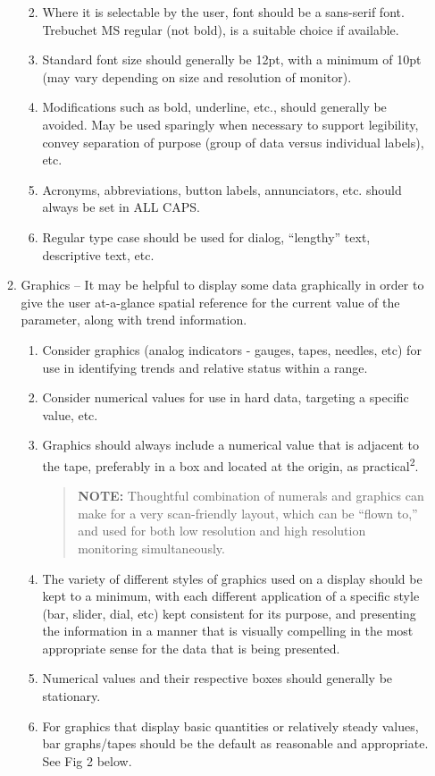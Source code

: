 \documentclass[
]{book}
\providecommand{\tightlist}{%
  \setlength{\itemsep}{0pt}\setlength{\parskip}{0pt}}
\begin{document}
\begin{enumerate}
\begin{enumerate}
    \begin{enumerate}
    \def\labelenumiii{\arabic{enumiii}.}
    \tightlist
    \item
      Where it is selectable by the user, font should be a sans-serif font. Trebuchet MS regular (not bold), is a suitable choice if available.
    \item
      Standard font size should generally be 12pt, with a minimum of 10pt (may vary depending on size and resolution of monitor).
    \item
      Modifications such as bold, underline, etc., should generally be avoided. May be used sparingly when necessary to support legibility, convey separation of purpose (group of data versus individual labels), etc.
    \item
      Acronyms, abbreviations, button labels, annunciators, etc. should always be set in ALL CAPS.
    \item
      Regular type case should be used for dialog, ``lengthy'' text, descriptive text, etc.
    \end{enumerate}
  \item
    Graphics -- It may be helpful to display some data graphically in order to give the user at-a-glance spatial reference for the current value of the parameter, along with trend information.

    \begin{enumerate}
    \def\labelenumiii{\arabic{enumiii}.}
    \item
      Consider graphics (analog indicators - gauges, tapes, needles, etc) for use in identifying trends and relative status within a range.
    \item
      Consider numerical values for use in hard data, targeting a specific value, etc.
    \item
      Graphics should always include a numerical value that is adjacent to the tape, preferably in a box and located at the origin, as practical\textsuperscript{2}.

      \begin{quote}
      \textbf{NOTE:} Thoughtful combination of numerals and graphics can make for a very scan-friendly layout, which can be ``flown to,'' and used for both low resolution and high resolution monitoring simultaneously.
      \end{quote}
    \item
      The variety of different styles of graphics used on a display should be kept to a minimum, with each different application of a specific style (bar, slider, dial, etc) kept consistent for its purpose, and presenting the information in a manner that is visually compelling in the most appropriate sense for the data that is being presented.
    \item
      Numerical values and their respective boxes should generally be stationary.
    \item
      For graphics that display basic quantities or relatively steady values, bar graphs/tapes should be the default as reasonable and appropriate. See Fig 2 below.
    \end{enumerate}


\end{enumerate}
\end{enumerate}
\end{document}
